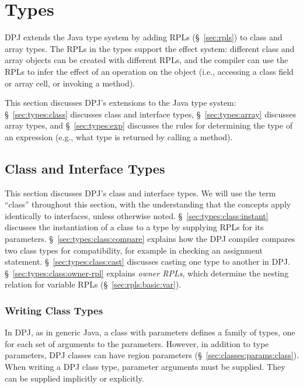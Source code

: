 \section{Types%
\label{sec:types}}

DPJ extends the Java type system by adding RPLs (\S~\ref{sec:rpls}) to
class and array types.  The RPLs in the types support the effect
system: different class and array objects can be created with
different RPLs, and the compiler can use the RPLs to infer the effect
of an operation on the object (i.e., accessing a class field or array
cell, or invoking a method).

This section discusses DPJ's extensions to the Java type system:
\S~\ref{sec:types:class} discusses class and interface types,
\S~\ref{sec:types:array} discusses array types, and
\S~\ref{sec:types:exp} discusses the rules for determining the type of
an expression (e.g., what type is returned by calling a method).

\subsection{Class and Interface Types
\label{sec:types:class}}

This section discusses DPJ's class and interface types.  We will use
the term ``class'' throughout this section, with the understanding
that the concepts apply identically to interfaces, unless otherwise
noted.  \S~\ref{sec:types:class:instant} discusses the instantiation
of a class to a type by supplying RPLs for its parameters.
\S~\ref{sec:types:class:compare} explains how the DPJ compiler
compares two class types for compatibility, for example in checking an
assignment statement.  \S~\ref{sec:types:class:cast} discusses casting
one type to another in DPJ.  \S~\ref{sec:types:class:owner-rpl}
explains \emph{owner RPLs}, which determine the nesting relation for
variable RPLs (\S~\ref{sec:rpls:basic:var}).

\subsubsection{Writing Class Types%
\label{sec:types:class:instant}}

In DPJ, as in generic Java, a class with parameters defines a family
of types, one for each set of arguments to the parameters.  However,
in addition to type parameters, DPJ classes can have region parameters
(\S~\ref{sec:classes:params:class}).  When writing a DPJ class type,
parameter arguments must be supplied.  They can be supplied implicitly
or explicitly.

